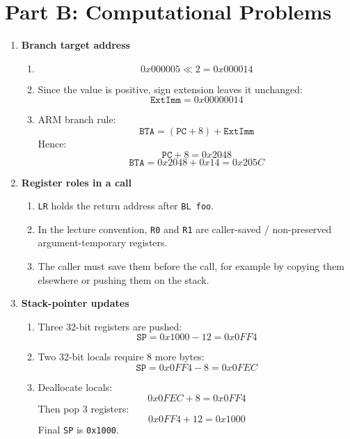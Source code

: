 \documentclass[11pt]{article}
\begin{document}
\section*{Part B: Computational Problems}
\begin{enumerate}[label=\textbf{B\arabic*.}]
  \item \textbf{Branch target address}
  \begin{enumerate}[label=(\alph*)]
    \item
    \[
      0x000005 \ll 2 = 0x000014
    \]
    \item Since the value is positive, sign extension leaves it unchanged:
    \[
      \texttt{ExtImm} = 0x00000014
    \]
    \item ARM branch rule:
    \[
      \texttt{BTA} = (\texttt{PC}+8) + \texttt{ExtImm}
    \]
    Hence:
    \[
      \texttt{PC}+8 = 0x2048
    \]
    \[
      \texttt{BTA} = 0x2048 + 0x14 = 0x205C
    \]
  \end{enumerate}

  \item \textbf{Register roles in a call}
  \begin{enumerate}[label=(\alph*)]
    \item \texttt{LR} holds the return address after \texttt{BL foo}.
    \item In the lecture convention, \texttt{R0} and \texttt{R1} are caller-saved / non-preserved argument-temporary registers.
    \item The caller must save them before the call, for example by copying them elsewhere or pushing them on the stack.
  \end{enumerate}

  \item \textbf{Stack-pointer updates}
  \begin{enumerate}[label=(\alph*)]
    \item Three 32-bit registers are pushed:
    \[
      \texttt{SP} = 0x1000 - 12 = 0x0FF4
    \]
    \item Two 32-bit locals require 8 more bytes:
    \[
      \texttt{SP} = 0x0FF4 - 8 = 0x0FEC
    \]
    \item Deallocate locals:
    \[
      0x0FEC + 8 = 0x0FF4
    \]
    Then pop 3 registers:
    \[
      0x0FF4 + 12 = 0x1000
    \]
    Final \texttt{SP} is \texttt{0x1000}.
  \end{enumerate}


\end{enumerate}
\end{document}
